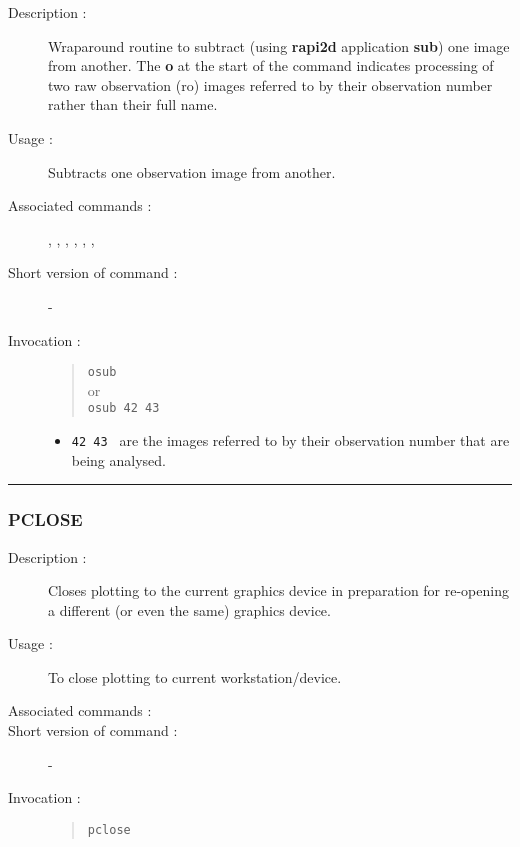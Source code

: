 \begin{description}

\item[Description :] Wraparound routine to subtract (using {\bf rapi2d}
application {\bf sub}) one image from another.  The {\bf o} at the start of
the command indicates processing of two raw observation ({\sc ro})
images referred to by their observation number rather than their full
name.

\item[Usage :] Subtracts one observation image from another.

\item[Associated commands :] {\tt {}},
{\tt {}}, {\tt {}},
{\tt {}}, {\tt {}},
{\tt {}}, {\tt {}}

\item[Short version of command :] -
\item[Invocation :]

\begin{quote}{\tt  osub }\\
or \\
{\tt osub 42 43 }
\end{quote}

\begin{itemize}

\item {\tt 42 43 } are the images referred to by their observation
 number that  are being analysed.
\end{itemize}

\end{description}

\hrule
\subsubsection*{\label{PCLOSE}PCLOSE}

\begin{description}

\item[Description :] Closes plotting to the current graphics device in
preparation for re-opening a different (or even the same) graphics
device.

\item[Usage :] To close plotting to current workstation/device.
\item[Associated commands :] {\tt {}}
\item[Short version of command :] -
\item[Invocation :]

\begin{quote}{\tt  pclose }\end{quote}

\end{description}

